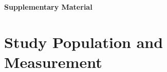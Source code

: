 \clearpage
\appendix
\raggedbottom
\setlength{\intextsep}{7pt plus 2pt minus 2pt}
\setlength{\textfloatsep}{9pt plus 2pt minus 2pt}
\setlength{\floatsep}{9pt plus 2pt minus 2pt}
\renewcommand{\thesection}{S\arabic{section}}\renewcommand{\theHsection}{S\arabic{section}}
\setcounter{figure}{0}
\setcounter{table}{0}

\newcommand{\cf}[1]{\textsf{\bfseries #1:}}
\newcommand{\unverified}{\textit{(source-reported)}}

\newcommand{\suppbox}[2]{%
  \par\smallskip\noindent{\setlength{\fboxsep}{7pt}%
  \fcolorbox{black!25}{black!2}{%
    \begin{minipage}{\dimexpr\linewidth-2\fboxsep-2\fboxrule\relax}%
      \footnotesize\textbf{#1}\par\smallskip #2%
    \end{minipage}}}%
  \par\smallskip}
\begin{center}
{\Large\bfseries Supplementary Material}
\end{center}

\section{Study Population and Measurement}\label{sec:s1}

